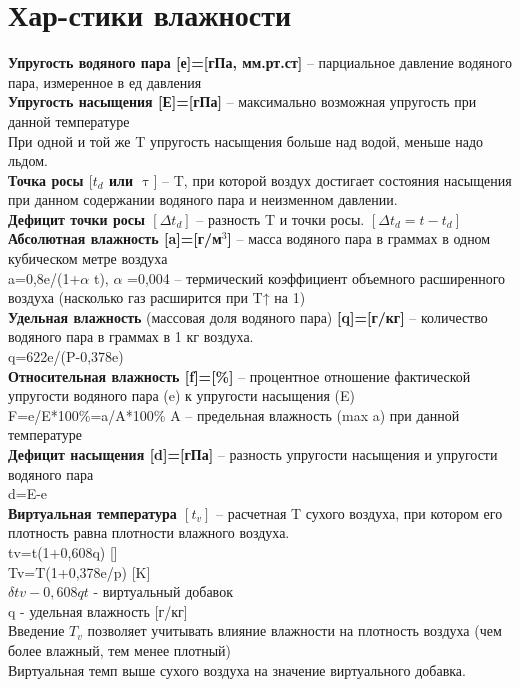 
\section{Хар-стики влажности}
\textbf{Упругость водяного пара [е]=[гПа, мм.рт.ст]} – парциальное давление водяного пара, измеренное в ед давления\\
\textbf{Упругость насыщения [Е]=[гПа]} – максимально возможная упругость при данной температуре\\
При одной и той же T упругость насыщения больше над водой, меньше надо льдом.\\
\textbf{Точка росы $[ t_{d} $ или $ \uptau ]$} – T, при которой воздух достигает состояния насыщения при данном содержании водяного пара и неизменном давлении.\\
\textbf{Дефицит точки росы $[\Delta t_{d} ]$} – разность T и точки росы.  $[\Delta t_{d}=t-t_{d}]$ \\
\textbf{Абсолютная влажность [a]=[г/м$^3$]} – масса водяного пара в граммах в одном кубическом метре воздуха\\
a=0,8e/(1+$\alpha$ t), $\alpha$ =0,004 – термический коэффициент объемного расширенного воздуха (насколько газ расширится при T↑ на 1\celsius)\\
\textbf{Удельная влажность} (массовая доля водяного пара) \textbf{[q]=[г/кг]} – количество водяного пара в граммах в 1 кг воздуха.\\
q=622e/(P-0,378e)	\\ 
\textbf{Относительная влажность [f]=[\%]} – процентное отношение фактической упругости водяного пара (e) к упругости насыщения (E)\\
F=e/E*100\%=a/A*100\%  A – предельная влажность (max a) при данной температуре\\ 
\textbf{Дефицит насыщения [d]=[гПа]} – разность упругости насыщения и упругости водяного пара\\
d=E-e\\
\textbf{Виртуальная температура $[t_v]$} – расчетная T сухого воздуха, при котором его плотность равна плотности влажного воздуха.\\
tv=t(1+0,608q) [\celsius]\\
Tv=T(1+0,378e/p) [K]\\
$\delta tv-0,608qt$ - виртуальный добавок\\
q - удельная влажность [г/кг]\\
Введение $T_v$ позволяет учитывать влияние влажности на плотность воздуха (чем более влажный, тем менее плотный)\\
Виртуальная темп выше сухого воздуха на значение виртуального добавка.